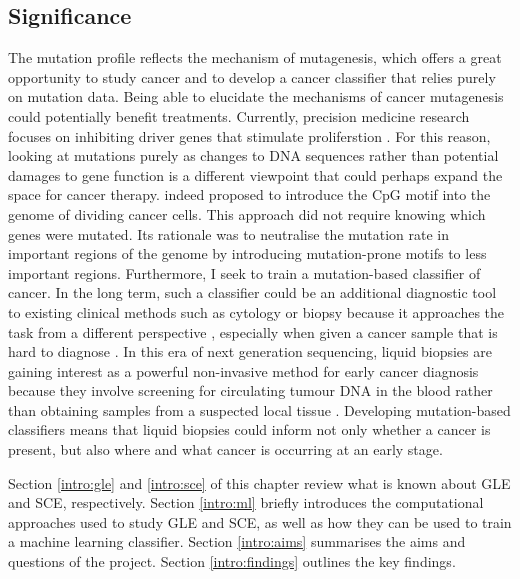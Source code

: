 \subsection{Significance}\label{intro:significance}
The mutation profile reflects the mechanism of mutagenesis, which offers a great opportunity to study cancer and to develop a cancer classifier that relies purely on mutation data. Being able to elucidate the mechanisms of cancer mutagenesis could potentially benefit treatments. Currently, precision medicine research focuses on inhibiting driver genes that stimulate proliferstion \citep[\textit{i.e.} oncogenes;][]{Mukherjee2019Genomics-GuidedCancer}. For this reason, looking at mutations purely as changes to DNA sequences rather than potential damages to gene function is a different viewpoint that could perhaps expand the space for cancer therapy. \citet{Chowdhury2018PresenceNucleotides} indeed proposed to introduce the CpG motif into the genome of dividing cancer cells. This approach did not require knowing which genes were mutated. Its rationale was to neutralise the mutation rate in important regions of the genome by introducing mutation-prone motifs to less important regions. Furthermore, I seek to train a mutation-based \gls{classifier} of cancer. In the long term, such a classifier could be an additional diagnostic tool to existing clinical methods such as cytology or biopsy because it approaches the task from a different perspective \citep{Stone1995Biopsy:Pitfalls}, especially when given a cancer sample that is hard to diagnose \citep{Sheahan1993MetastaticStatus}. In this era of next generation sequencing, liquid biopsies are gaining interest as a powerful non-invasive method for early cancer diagnosis because they involve screening for circulating tumour DNA in the blood rather than obtaining samples from a suspected local tissue \citep{Chen2019Next-generationDetection}. Developing mutation-based classifiers means that liquid biopsies could inform not only whether a cancer is present, but also where and what cancer is occurring at an early stage.

Section \ref{intro:gle} and \ref{intro:sce} of this chapter review what is known about GLE and SCE, respectively. Section \ref{intro:ml} briefly introduces the computational approaches used to study GLE and SCE, as well as how they can be used to train a machine learning classifier. Section \ref{intro:aims} summarises the aims and questions of the project. Section \ref{intro:findings} outlines the key findings.

